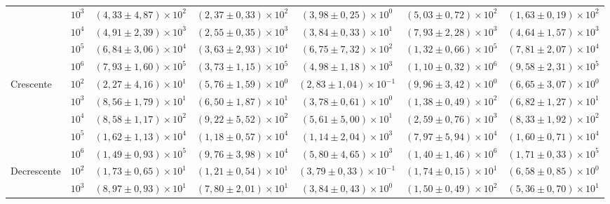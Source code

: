 \documentclass[12pt,a4paper]{report}
\begin{document}
\begin{table}[htbp]
\begin{tabular}{llccccc}
     & $10^{3}$ & $(4,33 \pm 4,87) \times 10^{2}$ & $(2,37 \pm 0,33) \times 10^{2}$ & $(3,98 \pm 0,25) \times 10^{0}$ & $(5,03 \pm 0,72) \times 10^{2}$ & $(1,63 \pm 0,19) \times 10^{2}$ \\
     & $10^{4}$ & $(4,91 \pm 2,39) \times 10^{3}$ & $(2,55 \pm 0,35) \times 10^{3}$ & $(3,84 \pm 0,33) \times 10^{1}$ & $(7,93 \pm 2,28) \times 10^{3}$ & $(4,64 \pm 1,57) \times 10^{3}$ \\
     & $10^{5}$ & $(6,84 \pm 3,06) \times 10^{4}$ & $(3,63 \pm 2,93) \times 10^{4}$ & $(6,75 \pm 7,32) \times 10^{2}$ & $(1,32 \pm 0,66) \times 10^{5}$ & $(7,81 \pm 2,07) \times 10^{4}$ \\
     & $10^{6}$ & $(7,93 \pm 1,60) \times 10^{5}$ & $(3,73 \pm 1,15) \times 10^{5}$ & $(4,98 \pm 1,18) \times 10^{3}$ & $(1,10 \pm 0,32) \times 10^{6}$ & $(9,58 \pm 2,31) \times 10^{5}$ \\
    \cmidrule{2-7}
    \multirow{5}{*}{Crescente} & $10^{2}$ & $(2,27 \pm 4,16) \times 10^{1}$ & $(5,76 \pm 1,59) \times 10^{0}$ & $(2,83 \pm 1,04) \times 10^{-1}$ & $(9,96 \pm 3,42) \times 10^{0}$ & $(6,65 \pm 3,07) \times 10^{0}$ \\
     & $10^{3}$ & $(8,56 \pm 1,79) \times 10^{1}$ & $(6,50 \pm 1,87) \times 10^{1}$ & $(3,78 \pm 0,61) \times 10^{0}$ & $(1,38 \pm 0,49) \times 10^{2}$ & $(6,82 \pm 1,27) \times 10^{1}$ \\
     & $10^{4}$ & $(8,58 \pm 1,17) \times 10^{2}$ & $(9,22 \pm 5,52) \times 10^{2}$ & $(5,61 \pm 5,00) \times 10^{1}$ & $(2,59 \pm 0,76) \times 10^{3}$ & $(8,33 \pm 1,92) \times 10^{2}$ \\
     & $10^{5}$ & $(1,62 \pm 1,13) \times 10^{4}$ & $(1,18 \pm 0,57) \times 10^{4}$ & $(1,14 \pm 2,04) \times 10^{3}$ & $(7,97 \pm 5,94) \times 10^{4}$ & $(1,60 \pm 0,71) \times 10^{4}$ \\
     & $10^{6}$ & $(1,49 \pm 0,93) \times 10^{5}$ & $(9,76 \pm 3,98) \times 10^{4}$ & $(5,80 \pm 4,65) \times 10^{3}$ & $(1,40 \pm 1,46) \times 10^{6}$ & $(1,71 \pm 0,33) \times 10^{5}$ \\
    \cmidrule{2-7}
    \multirow{5}{*}{Decrescente} & $10^{2}$ & $(1,73 \pm 0,65) \times 10^{1}$ & $(1,21 \pm 0,54) \times 10^{1}$ & $(3,79 \pm 0,33) \times 10^{-1}$ & $(1,74 \pm 0,15) \times 10^{1}$ & $(6,58 \pm 0,85) \times 10^{0}$ \\
     & $10^{3}$ & $(8,97 \pm 0,93) \times 10^{1}$ & $(7,80 \pm 2,01) \times 10^{1}$ & $(3,84 \pm 0,43) \times 10^{0}$ & $(1,50 \pm 0,49) \times 10^{2}$ & $(5,36 \pm 0,70) \times 10^{1}$ \\

\end{tabular}
\end{table}
\end{document}
